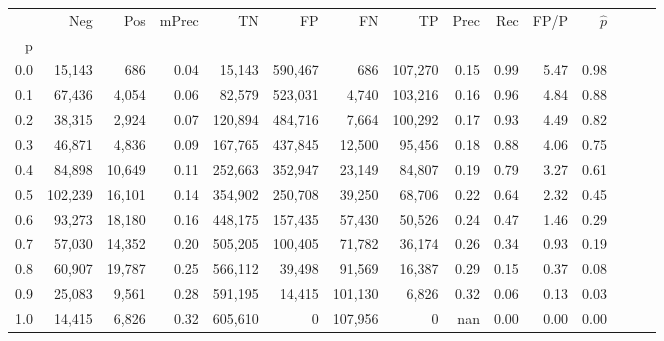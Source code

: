 \begin{tabular}{rrrrrrrrrrrrrrr}
\toprule
{} &      Neg &     Pos & mPrec &       TN &       FP &       FN &       TP &  Prec &   Rec &  FP/P & $\hat{p}$ \\
p   &          &         &       &          &          &          &          &       &       &       &           \\
\midrule
0.0 &   15,143 &     686 &  0.04 &   15,143 &  590,467 &      686 &  107,270 &  0.15 &  0.99 &  5.47 &      0.98 \\
0.1 &   67,436 &   4,054 &  0.06 &   82,579 &  523,031 &    4,740 &  103,216 &  0.16 &  0.96 &  4.84 &      0.88 \\
0.2 &   38,315 &   2,924 &  0.07 &  120,894 &  484,716 &    7,664 &  100,292 &  0.17 &  0.93 &  4.49 &      0.82 \\
0.3 &   46,871 &   4,836 &  0.09 &  167,765 &  437,845 &   12,500 &   95,456 &  0.18 &  0.88 &  4.06 &      0.75 \\
0.4 &   84,898 &  10,649 &  0.11 &  252,663 &  352,947 &   23,149 &   84,807 &  0.19 &  0.79 &  3.27 &      0.61 \\
0.5 &  102,239 &  16,101 &  0.14 &  354,902 &  250,708 &   39,250 &   68,706 &  0.22 &  0.64 &  2.32 &      0.45 \\
0.6 &   93,273 &  18,180 &  0.16 &  448,175 &  157,435 &   57,430 &   50,526 &  0.24 &  0.47 &  1.46 &      0.29 \\
0.7 &   57,030 &  14,352 &  0.20 &  505,205 &  100,405 &   71,782 &   36,174 &  0.26 &  0.34 &  0.93 &      0.19 \\
0.8 &   60,907 &  19,787 &  0.25 &  566,112 &   39,498 &   91,569 &   16,387 &  0.29 &  0.15 &  0.37 &      0.08 \\
0.9 &   25,083 &   9,561 &  0.28 &  591,195 &   14,415 &  101,130 &    6,826 &  0.32 &  0.06 &  0.13 &      0.03 \\
1.0 &   14,415 &   6,826 &  0.32 &  605,610 &        0 &  107,956 &        0 &   nan &  0.00 &  0.00 &      0.00 \\
\bottomrule
\end{tabular}
